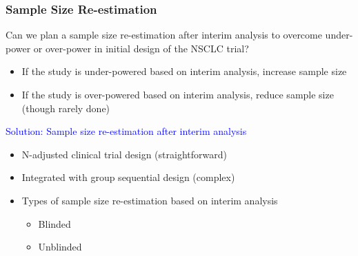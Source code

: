 \documentclass{beamer}
\begin{document}
\begin{frame}
	\frametitle{Sample Size Re-estimation}
 Can we plan a sample size re-estimation after interim analysis to overcome under-power or over-power in initial design of the NSCLC trial? \begin{itemize}
 	\item If the study is under-powered based on interim analysis, increase sample size
 	\item If the study is over-powered based on interim analysis, reduce sample size (though rarely done)
 \end{itemize}
 
 \textcolor{blue}{Solution: Sample size re-estimation after interim analysis}
 \begin{itemize}
	\item N-adjusted clinical trial design (straightforward)
	\item Integrated with group sequential design (complex)
    \item Types of sample size re-estimation based on interim analysis \begin{itemize}
       \item Blinded
       \item Unblinded
\end{itemize}
\end{itemize}
\end{frame}
\end{document}

